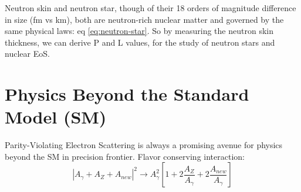 Neutron skin and neutron star, though of their 18 orders of magnitude difference 
in size (fm vs km), both are neutron-rich nuclear matter and governed by the 
same physical laws: eq \eqref{eq:neutron-star}. So by measuring the neutron
skin thickness, we can derive P and L values, for the study of neutron stars
and nuclear EoS.

\section{Physics Beyond the Standard Model (SM)} 
Parity-Violating Electron Scattering is always a promising avenue for physics
beyond the SM in precision frontier.
Flavor conserving interaction:
$$ |A_\gamma + A_Z + A_{new}|^2 \rightarrow A^2_\gamma\left[ 1 + 2\frac{A_Z}{A_\gamma}
 + 2\frac{A_{new}}{A_\gamma} \right]$$

